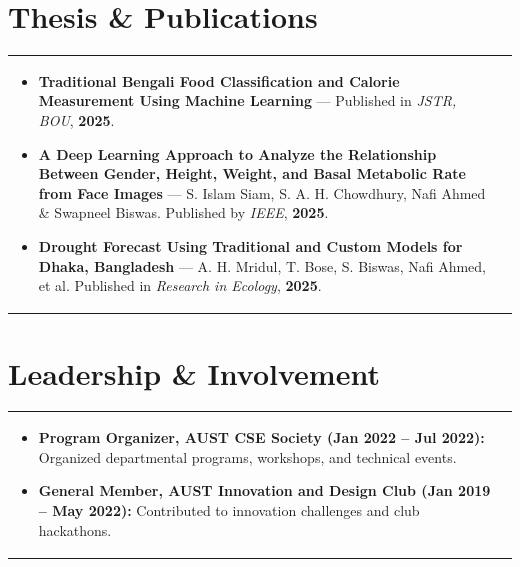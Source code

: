\documentclass[a4paper,8pt]{article}
\begin{document}
\section{Thesis \& Publications}
\begin{tabularx}{\linewidth}{ @{}l r@{} }
\begin{minipage}[t]{\linewidth}
\begin{itemize}[nosep, after=\strut, leftmargin=1.5em, itemsep=3.5pt]
\item \textbf{Traditional Bengali Food Classification and Calorie Measurement Using Machine Learning} — Published in \textit{JSTR, BOU}, \textbf{2025}.
\item \textbf{A Deep Learning Approach to Analyze the Relationship Between Gender, Height, Weight, and Basal Metabolic Rate from Face Images} — S. Islam Siam, S. A. H. Chowdhury, Nafi Ahmed \& Swapneel Biswas. Published by \textit{IEEE}, \textbf{2025}.
\item \textbf{Drought Forecast Using Traditional and Custom Models for Dhaka, Bangladesh} — A. H. Mridul, T. Bose, S. Biswas, Nafi Ahmed, et al. Published in \textit{Research in Ecology}, \textbf{2025}.
\end{itemize}
\end{minipage}
\end{tabularx}

\vspace{8pt}
\section{Leadership \& Involvement}
\begin{tabularx}{\linewidth}{ @{}l r@{} }
\begin{minipage}[t]{\linewidth}
\begin{itemize}[nosep,after=\strut, leftmargin=1.5em, itemsep=3pt]
\item \textbf{Program Organizer, AUST CSE Society (Jan 2022 – Jul 2022):} Organized departmental programs, workshops, and technical events.
\item \textbf{General Member, AUST Innovation and Design Club (Jan 2019 – May 2022):} Contributed to innovation challenges and club hackathons.
\end{itemize}
\end{minipage}
\end{tabularx}

\vspace{8pt}
\end{document}
